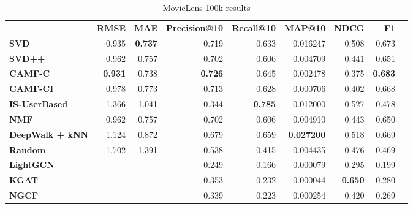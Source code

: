 \begin{table}[!htp]\centering
\caption{MovieLens 100k results}\label{tab:ml100ktable}
\scriptsize
\begin{tabular}{lrrrrrrrr}\toprule
&\textbf{RMSE} &\textbf{MAE} &\textbf{Precision@10} &\textbf{Recall@10} &\textbf{MAP@10} &\textbf{NDCG} &\textbf{F1} \\\cmidrule{2-8}
\textbf{SVD} &0.935 &\textbf{0.737} &0.719 &0.633 &0.016247 &0.508 &0.673 \\\cmidrule{1-8}
\textbf{SVD++} &0.962 &0.757 &0.702 &0.606 &0.004709 &0.441 &0.651 \\\cmidrule{1-8}
\textbf{CAMF-C} &\textbf{0.931} &0.738 &\textbf{0.726} &0.645 &0.002478 &0.375 &\textbf{0.683} \\\cmidrule{1-8}
\textbf{CAMF-CI} &0.978 &0.773 &0.713 &0.628 &0.000706 &0.402 &0.668 \\\cmidrule{1-8}
\textbf{IS-UserBased} &1.366 &1.041 &0.344 &\textbf{0.785} &0.012000 &0.527 &0.478 \\\cmidrule{1-8}
\textbf{NMF} &0.962 &0.757 &0.702 &0.606 &0.004910 &0.443 &0.650 \\\cmidrule{1-8}
\textbf{DeepWalk + kNN} &1.124 &0.872 &0.679 &0.659 &\textbf{0.027200} &0.518 &0.669 \\\cmidrule{1-8}
\textbf{Random} &\ul{1.702} &\ul{1.391} &0.538 &0.415 &0.004435 &0.476 &0.469 \\\cmidrule{1-8}
\textbf{LightGCN} & & &\ul{0.249} &\ul{0.166} &0.000079 &\ul{0.295} &\ul{0.199} \\\cmidrule{1-1}\cmidrule{1-8}
\textbf{KGAT} & & &0.353 &0.232 &\ul{0.000044} &\textbf{0.650} &0.280 \\\midrule
\textbf{NGCF} & & &0.339 &0.223 &0.000254 &0.420 &0.269 \\
\bottomrule
\end{tabular}
\end{table}


